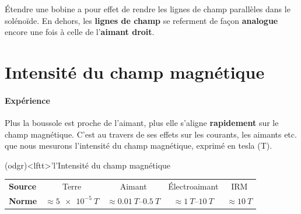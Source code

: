\documentclass[../../main/main.tex]{subfiles}
\begin{document}

Étendre une bobine a pour effet de rendre les lignes de champ parallèles dans le
solénoïde. En dehors, les \textbf{lignes de champ} se referment de façon
\textbf{analogue} encore une fois à celle de l'\textbf{aimant droit}.

\section{Intensité du champ magnétique}
\label{sec:intchp}
\paragraph*{Expérience} Plus la boussole est proche de l'aimant, plus elle
s'aligne \textbf{rapidement} sur le champ magnétique. C'est au travers de ses
effets sur les courants, les aimants etc. que nous mesurons l'intensité du champ
magnétique, exprimé en tesla (\si{T}).
\begin{tcb*}(odgr)<lftt>'l'{Intensité du champ magnétique}
	\begin{center}
		\begin{tabular}{lcccc}
			\toprule
			\textbf{Source}
			 &
			Terre
			 &
			Aimant
			 &
			Électroaimant
			 &
			IRM
			\\
			\textbf{Norme}
			 &
			$ \approx \SI{5e-5}{T} $
			 &
			$ \approx \SIrange{0.01}{0.5}{T} $
			 &
			$ \approx \SIrange{1}{10}{T} $
			 &
			$ \approx \SI{10}{T} $
			\\
			\bottomrule
		\end{tabular}
	\end{center}
\end{tcb*}
\end{document}
